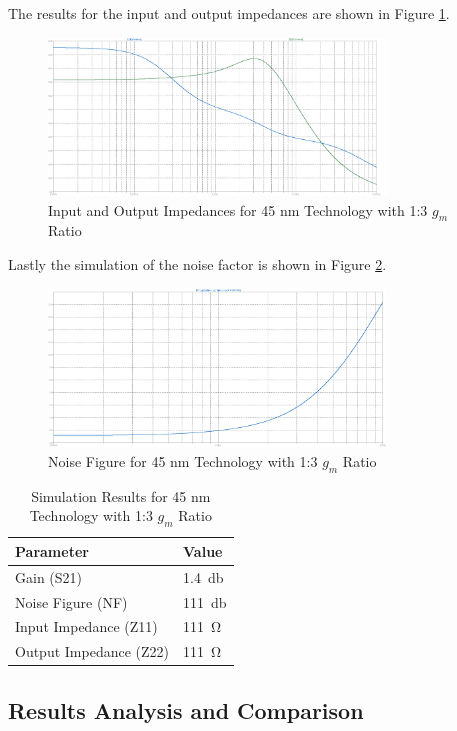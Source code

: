 The results for the input and output impedances are shown in Figure \ref{fig:ZParam45nm1to3}.

\begin{figure}[H]
    \centering
    \includegraphics[width=0.8\textwidth]{Images/Imp_45_1To3.png}
    \caption{Input and Output Impedances for 45 nm Technology with 1:3 $g_m$ Ratio}
    \label{fig:ZParam45nm1to3}
\end{figure}

Lastly the simulation of the noise factor is shown in Figure \ref{fig:Noise45nm1to3}.
\begin{figure}[H]
    \centering
    \includegraphics[width=0.8\textwidth]{Images/Noise_45_1To3.png}
    \caption{Noise Figure for 45 nm Technology with 1:3 $g_m$ Ratio}
    \label{fig:Noise45nm1to3}
\end{figure}

\begin{table}[H]
    \centering
    \caption{Simulation Results for 45 nm Technology with 1:3 $g_m$ Ratio}
    \begin{tabularx}{\textwidth}{>{\centering\arraybackslash}X >{\centering\arraybackslash}X }
        \toprule
        \textbf{Parameter} & \textbf{Value}\\
        \midrule
        Gain (S21) & \SI{1.4}{\decibel} \\
        \midrule
        Noise Figure (NF) & \SI{111}{\decibel} \\
        \midrule
        Input Impedance (Z11) & \SI{111}{\ohm} \\
        \midrule
        Output Impedance (Z22) & \SI{111}{\ohm} \\
        \bottomrule
    \end{tabularx}
    \label{tab:45nm_1ton_results}
\end{table}


\subsection{Results Analysis and Comparison}